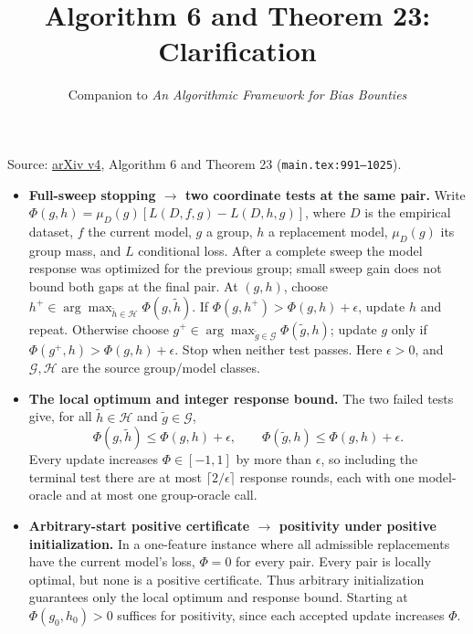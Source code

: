 \documentclass[11pt]{article}
\title{Algorithm 6 and Theorem 23: Clarification}
\author{Companion to \emph{An Algorithmic Framework for Bias Bounties}}
\date{}
\begin{document}
\maketitle
Source: \href{https://arxiv.org/abs/2201.10408v4}{arXiv v4}, Algorithm 6 and Theorem 23 (\texttt{main.tex:991--1025}).
\begin{itemize}
\item \textbf{Full-sweep stopping $\to$ two coordinate tests at the same pair.}
Write $\Phi(g,h)=\mu_D(g)[L(D,f,g)-L(D,h,g)]$, where $D$ is the empirical dataset, $f$ the current model, $g$ a group, $h$ a replacement model, $\mu_D(g)$ its group mass, and $L$ conditional loss. After a complete sweep the model response was optimized for the previous group; small sweep gain does not bound both gaps at the final pair.
At $(g,h)$, choose $h^+\in\arg\max_{\widetilde h\in\mathcal H}\Phi(g,\widetilde h)$.
If $\Phi(g,h^+)>\Phi(g,h)+\epsilon$, update $h$ and repeat.
Otherwise choose $g^+\in\arg\max_{\widetilde g\in\mathcal G}\Phi(\widetilde g,h)$;
update $g$ only if $\Phi(g^+,h)>\Phi(g,h)+\epsilon$.
Stop when neither test passes. Here $\epsilon>0$, and $\mathcal G,\mathcal H$ are the source group/model classes.
\item \textbf{The local optimum and integer response bound.}
The two failed tests give, for all $\widetilde h\in\mathcal H$ and $\widetilde g\in\mathcal G$,
\[
\Phi(g,\widetilde h)\le\Phi(g,h)+\epsilon,
\qquad \Phi(\widetilde g,h)\le\Phi(g,h)+\epsilon.
\]
Every update increases $\Phi\in[-1,1]$ by more than $\epsilon$, so including the terminal test there are at most $\lceil2/\epsilon\rceil$ response rounds, each with one model-oracle and at most one group-oracle call.
\item \textbf{Arbitrary-start positive certificate $\to$ positivity under positive initialization.}
In a one-feature instance where all admissible replacements have the current model's loss, $\Phi=0$ for every pair. Every pair is locally optimal, but none is a positive certificate. Thus arbitrary initialization guarantees only the local optimum and response bound. Starting at $\Phi(g_0,h_0)>0$ suffices for positivity, since each accepted update increases $\Phi$.
\end{itemize}
\end{document}

